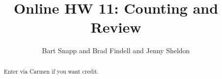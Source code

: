 \documentclass[handout,space,nooutcomes]{xourse}
\title{Online HW 11: Counting and Review}
\author{Bart Snapp and Brad Findell and Jenny Sheldon}
\begin{document}
\begin{abstract}
Enter via Carmen if you want credit.   
\end{abstract}
\maketitle


\end{document}
